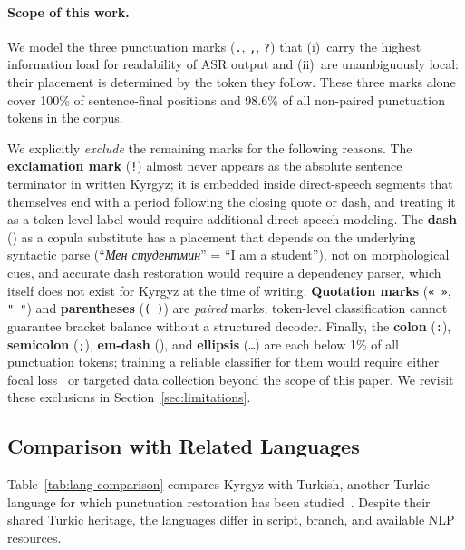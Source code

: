 \documentclass[manuscript, review]{acmart}
\begin{document}
\paragraph{Scope of this work.} We model the three punctuation marks (\texttt{.}, \texttt{,}, \texttt{?}) that (i)~carry the highest information load for readability of ASR output and (ii)~are unambiguously local: their placement is determined by the token they follow. These three marks alone cover 100\% of sentence-final positions and 98.6\% of all non-paired punctuation tokens in the corpus.

We explicitly \emph{exclude} the remaining marks for the following reasons. The \textbf{exclamation mark} (\texttt{!}) almost never appears as the absolute sentence terminator in written Kyrgyz; it is embedded inside direct-speech segments that themselves end with a period following the closing quote or dash, and treating it as a token-level label would require additional direct-speech modeling. The \textbf{dash} (\texttt{\textendash}) as a copula substitute has a placement that depends on the underlying syntactic parse (``\textit{Мен \textendash{} студентмин}'' = ``I am a student''), not on morphological cues, and accurate dash restoration would require a dependency parser, which itself does not exist for Kyrgyz at the time of writing. \textbf{Quotation marks} (\texttt{«\,»}, \texttt{"\,"}) and \textbf{parentheses} (\texttt{(\,)}) are \emph{paired} marks; token-level classification cannot guarantee bracket balance without a structured decoder. Finally, the \textbf{colon} (\texttt{:}), \textbf{semicolon} (\texttt{;}), \textbf{em-dash} (\texttt{\textemdash}), and \textbf{ellipsis} (\texttt{\ldots}) are each below 1\% of all punctuation tokens; training a reliable classifier for them would require either focal loss~\cite{lin2017focal} or targeted data collection beyond the scope of this paper. We revisit these exclusions in Section~\ref{sec:limitations}.

\subsection{Comparison with Related Languages}

Table~\ref{tab:lang-comparison} compares Kyrgyz with Turkish, another Turkic language for which punctuation restoration has been studied~\cite{kurt2023turkish}. Despite their shared Turkic heritage, the languages differ in script, branch, and available NLP resources.
\end{document}
